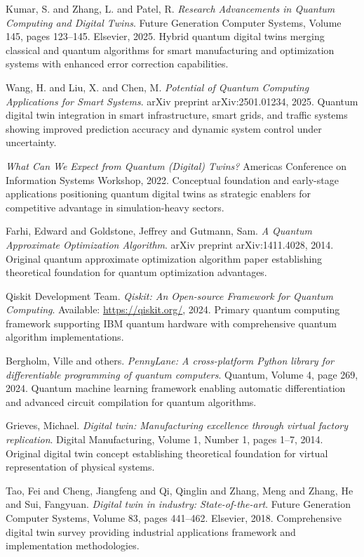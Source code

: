 \documentclass[12pt,a4paper]{article}
\begin{document}
\begin{thebibliography}{99}
Kumar, S. and Zhang, L. and Patel, R.
\textit{Research Advancements in Quantum Computing and Digital Twins}.
Future Generation Computer Systems, Volume 145, pages 123--145. Elsevier, 2025.
Hybrid quantum digital twins merging classical and quantum algorithms for smart manufacturing and optimization systems with enhanced error correction capabilities.

Wang, H. and Liu, X. and Chen, M.
\textit{Potential of Quantum Computing Applications for Smart Systems}.
arXiv preprint arXiv:2501.01234, 2025.
Quantum digital twin integration in smart infrastructure, smart grids, and traffic systems showing improved prediction accuracy and dynamic system control under uncertainty.

\textit{What Can We Expect from Quantum (Digital) Twins?}
Americas Conference on Information Systems Workshop, 2022.
Conceptual foundation and early-stage applications positioning quantum digital twins as strategic enablers for competitive advantage in simulation-heavy sectors.

Farhi, Edward and Goldstone, Jeffrey and Gutmann, Sam.
\textit{A Quantum Approximate Optimization Algorithm}.
arXiv preprint arXiv:1411.4028, 2014.
Original quantum approximate optimization algorithm paper establishing theoretical foundation for quantum optimization advantages.

Qiskit Development Team.
\textit{Qiskit: An Open-source Framework for Quantum Computing}.
Available: \url{https://qiskit.org/}, 2024.
Primary quantum computing framework supporting IBM quantum hardware with comprehensive quantum algorithm implementations.

Bergholm, Ville and others.
\textit{PennyLane: A cross-platform Python library for differentiable programming of quantum computers}.
Quantum, Volume 4, page 269, 2024.
Quantum machine learning framework enabling automatic differentiation and advanced circuit compilation for quantum algorithms.

Grieves, Michael.
\textit{Digital twin: Manufacturing excellence through virtual factory replication}.
Digital Manufacturing, Volume 1, Number 1, pages 1--7, 2014.
Original digital twin concept establishing theoretical foundation for virtual representation of physical systems.

Tao, Fei and Cheng, Jiangfeng and Qi, Qinglin and Zhang, Meng and Zhang, He and Sui, Fangyuan.
\textit{Digital twin in industry: State-of-the-art}.
Future Generation Computer Systems, Volume 83, pages 441--462. Elsevier, 2018.
Comprehensive digital twin survey providing industrial applications framework and implementation methodologies.


\end{thebibliography}
\end{document}
